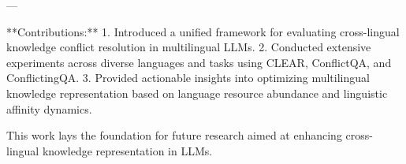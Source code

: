 ---

**Contributions:**  
1. Introduced a unified framework for evaluating cross-lingual knowledge conflict resolution in multilingual LLMs.  
2. Conducted extensive experiments across diverse languages and tasks using CLEAR, ConflictQA, and ConflictingQA.  
3. Provided actionable insights into optimizing multilingual knowledge representation based on language resource abundance and linguistic affinity dynamics.  

This work lays the foundation for future research aimed at enhancing cross-lingual knowledge representation in LLMs.